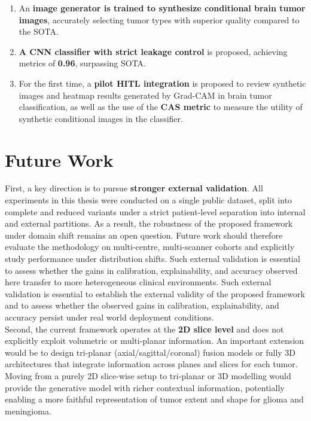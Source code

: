 \begin{enumerate}
    \item An \textbf{image generator is trained to synthesize conditional brain tumor images}, accurately selecting tumor types with superior quality compared to the SOTA.
    
    
    \item  \textbf{A CNN classifier with strict leakage control} is proposed, achieving metrics of \textbf{0.96}, surpassing SOTA.
    
    \item For the first time, a \textbf{pilot HITL integration} is proposed to review synthetic images and heatmap results generated by Grad-CAM in brain tumor classification, as well as the use of the \textbf{CAS metric} to measure the utility of synthetic conditional images in the classifier.
\end{enumerate}

\section{Future Work}

First, a key direction is to pursue \textbf{stronger external validation}. All experiments in this thesis were conducted on a single public dataset, split into complete and reduced variants under a strict patient-level separation into internal and external partitions. As a result, the robustness of the proposed framework under domain shift remains an open question. Future work should therefore evaluate the methodology on multi-centre, multi-scanner cohorts and explicitly study performance under distribution shifts. Such external validation is essential to assess whether the gains in calibration, explainability, and accuracy observed here transfer to more heterogeneous clinical environments. Such external validation is essential to establish the external validity of the proposed framework and to assess whether the observed gains in calibration, explainability, and accuracy persist under real world deployment conditions.
\\

Second, the current framework operates at the \textbf{2D slice level} and does not explicitly exploit volumetric or multi-planar information. An important extension would be to design tri-planar (axial/sagittal/coronal) fusion models or fully 3D architectures that integrate information across planes and slices for each tumor. Moving from a purely 2D slice-wise setup to tri-planar or 3D modelling would provide the generative model with richer contextual information, potentially enabling a more faithful representation of tumor extent and shape for glioma and meningioma.\\

